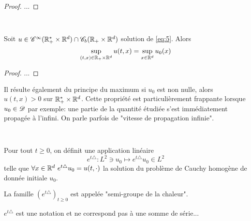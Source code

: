 \documentclass[french,a4paper,10pt]{article}
\begin{document}
            \begin{proof}
                ...
            \end{proof}

            \begin{proposition}\label{3.3.5}~ 
            
                Soit $u \in \mathscr{C}^{\infty}(\mathbb{R}^*_+ \times \mathbb{R}^d)\cap \mathscr{C}_b(\mathbb{R}_+\times \mathbb{R}^d)$ solution de \eqref{eq:5}. Alors 
                \begin{equation*}
                    \sup\limits_{(t,x)\in \mathbb{R}_+\times \mathbb{R}^d} u(t,x) = \sup\limits_{x\in \mathbb{R}^d}u_0(x)
                \end{equation*}
            \end{proposition}

            \begin{proof}
                ...
            \end{proof}

            \begin{remark}\label{rem:3.3.6}                
                Il résulte également du principe du maximum si $u_0$ est non nulle, alors \\ 
                $u(t,x)>0$ sur $\mathbb{R}^*_+ \times \mathbb{R}^d$. Cette propriété est particulièrement frappante lorsque $u_0 \in \mathscr{D}$ par exemple: une partie de la quantité étudiée s'est immédiatement propagée à l'infini. On parle parfois de "vitesse de propagation infinie".
            \end{remark}

            \begin{definition}\label{def:3.3.7}~

                Pour tout $t\geq 0$, on définit une application linéaire 
                \begin{equation*}
                    e^{t\triangle}\colon L^2 \ni u_0 \longmapsto e^{t\triangle}u_0 \in L^2
                \end{equation*}
                telle que $\forall x \in \R^d \ e^{t\triangle}u_0 = u(t,\cdot)$ la solution du problème de Cauchy homogène de donnée initiale $u_0$. 

                La famille $(e^{t\triangle})_{t \geq0}$ est appelée "semi-groupe de la chaleur".
            \end{definition}

            \begin{remark}\label{3.3.8}
                $e^{t\triangle}$ est une notation et ne correspond pas à une somme de série...
            \end{remark}
\end{document}
